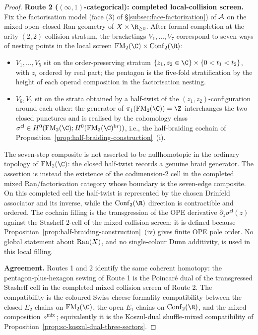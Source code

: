 \begin{proof}
\medskip\noindent\textbf{Route 2 ($(\infty,1)$-categorical):
completed local-collision screen.}
Fix the factorisation model (face (3) of \S\ref{subsec:face-factorization})
of $\mathcal{A}$ on the mixed open--closed Ran geometry of
$X\times\R_{\geq 0}$. After formal completion at the arity $(2,2)$
collision stratum, the bracketings $V_1,\ldots,V_7$ correspond to
seven ways of nesting points in the local screen
$\FM_2(\C)\times\mathrm{Conf}_2(\R)$:
\begin{itemize}
\item $V_1,\ldots,V_5$ sit on the order-preserving
stratum $\{z_1,z_2\in\C\}\times\{0<t_1<t_2\}$, with $z_i$
ordered by real part; the pentagon is the five-fold stratification
by the height of each operad composition in the factorisation
nesting.
\item $V_6, V_7$ sit on the strata obtained by a half-twist of
the $(z_1, z_2)$-configuration around each other: the generator of
$\pi_1(\FM_2(\C)) = \Z$ interchanges the two closed punctures and is
realised by the cohomology class
$\sigma^{\mathsf{cl}} \in H^0(\FM_2(\C); H^0(\FM_2(\C)^{\mathrm{br}}))$,
i.e., the half-braiding cochain of
Proposition~\ref{prop:half-braiding-construction}~(i).
\end{itemize}
The seven-step composite is not asserted to be nullhomotopic in the
ordinary topology of $\FM_2(\C)$: the closed half-twist records a
genuine braid generator. The assertion is instead the existence of
the codimension-$2$ cell in the completed mixed Ran/factorisation
category whose boundary is the seven-edge composite. On this completed
cell the half-twist is represented by the chosen Drinfeld associator
and its inverse, while the $\mathrm{Conf}_2(\R)$ direction is
contractible and ordered. The cochain filling is the transgression of
the OPE derivative $\partial_z\sigma^{\mathsf{cl}}(z)$ against the
Stasheff $2$-cell of the mixed collision screen; it is defined because
Proposition~\ref{prop:half-braiding-construction}~(iv) gives finite
OPE pole order. No global statement about $\mathrm{Ran}(X)$, and no
single-colour Dunn additivity, is used in this local filling.

\medskip\noindent\textbf{Agreement.} Routes 1 and 2 identify the
same coherent homotopy: the pentagon-plus-hexagon sewing of Route 1
is the Poincar\'e dual of the transgressed Stasheff cell in the
completed mixed collision screen of Route 2. The compatibility is the
coloured Swiss-cheese formality compatibility between the closed
$E_2$ chains on $\FM_2(\C)$, the open $E_1$ chains on
$\mathrm{Conf}_2(\R)$, and the mixed composition
$\circ^{\mathrm{mix}}$; equivalently it is the Koszul-dual
shuffle-mixed compatibility of
Proposition~\ref{prop:sc-koszul-dual-three-sectors}.
\end{proof}

